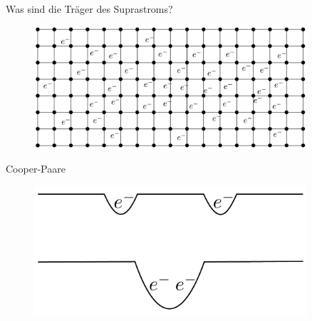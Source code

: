 \begin{frame}{Was sind die Träger des Suprastroms?}
  \begin{figure}
    \centering
    \includegraphics[width = 0.9\textwidth]{bilder/elektronengas.pdf}
    \label{fig: elektronengas}
  \end{figure}
\end{frame}


\begin{frame}{Cooper-Paare}
  \begin{figure}
    \centering
    \includegraphics[width = 0.9\textwidth]{bilder/cooper.pdf}
    \label{fig: cooper}
  \end{figure}
\end{frame}
